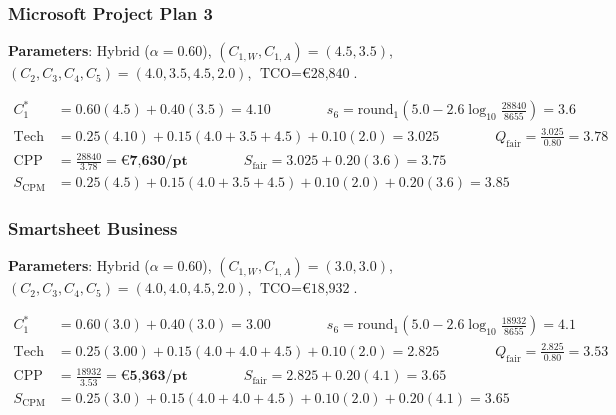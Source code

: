 \subsubsection{Microsoft Project Plan 3}
\textbf{Parameters}: Hybrid ($\alpha = 0.60$), $(C_{1,W}, C_{1,A}) = (4.5, 3.5)$, $(C_2, C_3, C_4, C_5) = (4.0, 3.5, 4.5, 2.0)$, $\text{TCO} = \text{€28,840}$.
\begin{small}
\begin{align*}
    C_1^* &= 0.60(4.5) + 0.40(3.5) = \mathbf{4.10} \qquad \qquad
    s_6 = \text{round}_1\!\left(5.0 - 2.6\log_{10}\!\tfrac{28840}{8655}\right) = \mathbf{3.6} \\
    \text{Tech} &= 0.25(4.10) + 0.15(4.0 + 3.5 + 4.5) + 0.10(2.0) = 3.025 \qquad \qquad
    Q_{\text{fair}} = \tfrac{3.025}{0.80} = \mathbf{3.78} \\
    \text{CPP} &= \tfrac{28840}{3.78} = \mathbf{\text{€7,630/pt}} \qquad \qquad
    S_{\text{fair}} = 3.025 + 0.20(3.6) = \mathbf{3.75} \\
    S_{\text{CPM}} &= 0.25(4.5) + 0.15(4.0 + 3.5 + 4.5) + 0.10(2.0) + 0.20(3.6) = \mathbf{3.85}
\end{align*}
\end{small}

\subsubsection{Smartsheet Business}
\textbf{Parameters}: Hybrid ($\alpha = 0.60$), $(C_{1,W}, C_{1,A}) = (3.0, 3.0)$, $(C_2, C_3, C_4, C_5) = (4.0, 4.0, 4.5, 2.0)$, $\text{TCO} = \text{€18,932}$.
\begin{small}
\begin{align*}
    C_1^* &= 0.60(3.0) + 0.40(3.0) = \mathbf{3.00} \qquad \qquad
    s_6 = \text{round}_1\!\left(5.0 - 2.6\log_{10}\!\tfrac{18932}{8655}\right) = \mathbf{4.1} \\
    \text{Tech} &= 0.25(3.00) + 0.15(4.0 + 4.0 + 4.5) + 0.10(2.0) = 2.825 \qquad \qquad
    Q_{\text{fair}} = \tfrac{2.825}{0.80} = \mathbf{3.53} \\
    \text{CPP} &= \tfrac{18932}{3.53} = \mathbf{\text{€5,363/pt}} \qquad \qquad
    S_{\text{fair}} = 2.825 + 0.20(4.1) = \mathbf{3.65} \\
    S_{\text{CPM}} &= 0.25(3.0) + 0.15(4.0 + 4.0 + 4.5) + 0.10(2.0) + 0.20(4.1) = \mathbf{3.65}
\end{align*}
\end{small}

